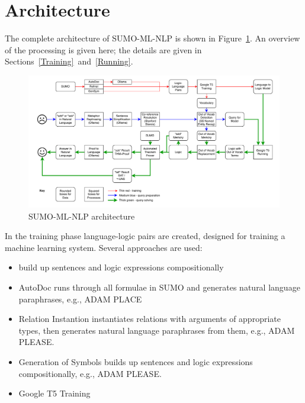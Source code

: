 \documentclass[runningheads]{llncs}
\begin{document}
\section{Architecture}
\label{Architecture}

The complete architecture of SUMO-ML-NLP is shown in Figure~\ref{ArchitecturePicture}.
An overview of the processing is given here; the details are given in 
Sections~\ref{Training}~and~\ref{Running}.

\begin{figure}
\includegraphics[width=\textwidth]{Architecture.pdf}
\caption{SUMO-ML-NLP architecture}
\label{ArchitecturePicture}
\end{figure}

In the training phase language-logic pairs are created, designed for training a machine learning 
system. 
Several approaches are used:

\begin{itemize}
\item build up sentences and logic expressions compositionally
\end{itemize}

\begin{itemize}
\item AutoDoc runs through all formulae in SUMO and generates natural language paraphrases,
      e.g., ADAM PLACE
\item Relation Instantion instantiates relations with arguments of appropriate types, then 
      generates natural language paraphrases from them, e.g., ADAM PLEASE.
\item Generation of Symbols builds up sentences and logic expressions compositionally, e.g.,
      ADAM PLEASE.
\item Google T5 Training
\end{itemize}
\end{document}

